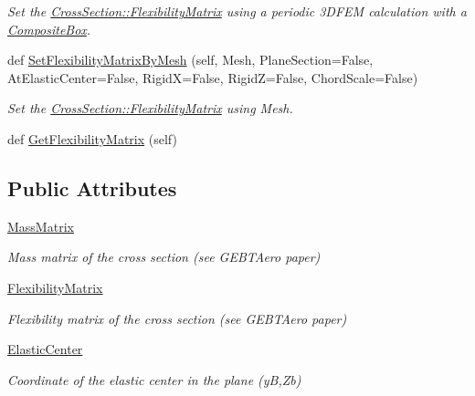 \begin{DoxyCompactItemize}
\begin{DoxyCompactList}\small\item\em Set the \hyperlink{classgebtaero_1_1_cross_section_1_1_cross_section_ac20eafaf38ff757f9a8c9ae89212396a}{Cross\+Section\+::\+Flexibility\+Matrix} using a periodic 3\+D\+F\+EM calculation with a \hyperlink{namespacegebtaero_1_1_composite_box}{Composite\+Box}. \end{DoxyCompactList}\item 
def \hyperlink{classgebtaero_1_1_cross_section_1_1_cross_section_a70eb1851ddf4a3f88fb14cfc827e0c83}{Set\+Flexibility\+Matrix\+By\+Mesh} (self, Mesh, Plane\+Section=False, At\+Elastic\+Center=False, RigidX=False, RigidZ=False, Chord\+Scale=False)
\begin{DoxyCompactList}\small\item\em Set the \hyperlink{classgebtaero_1_1_cross_section_1_1_cross_section_ac20eafaf38ff757f9a8c9ae89212396a}{Cross\+Section\+::\+Flexibility\+Matrix} using Mesh. \end{DoxyCompactList}\item 
def \hyperlink{classgebtaero_1_1_cross_section_1_1_cross_section_ac06cec90003112b1de53b100c0085842}{Get\+Flexibility\+Matrix} (self)
\end{DoxyCompactItemize}
\subsection*{Public Attributes}
\begin{DoxyCompactItemize}
\item 
\hyperlink{classgebtaero_1_1_cross_section_1_1_cross_section_ae9be8649853163b2b4dfdaa3584d9f78}{Mass\+Matrix}
\begin{DoxyCompactList}\small\item\em Mass matrix of the cross section (see G\+E\+B\+T\+Aero paper) \end{DoxyCompactList}\item 
\hyperlink{classgebtaero_1_1_cross_section_1_1_cross_section_ac20eafaf38ff757f9a8c9ae89212396a}{Flexibility\+Matrix}
\begin{DoxyCompactList}\small\item\em Flexibility matrix of the cross section (see G\+E\+B\+T\+Aero paper) \end{DoxyCompactList}\item 
\hyperlink{classgebtaero_1_1_cross_section_1_1_cross_section_a1eb436d0de5edf2c25612bbc15d88d91}{Elastic\+Center}
\begin{DoxyCompactList}\small\item\em Coordinate of the elastic center in the plane (yB,Zb) \end{DoxyCompactList}\end{DoxyCompactItemize}



